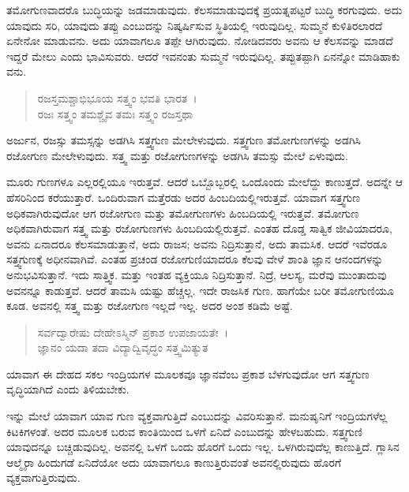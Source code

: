 ತಮೋಗುಣವಾದರೊ ಬುದ್ಧಿಯನ್ನು ಜಡಮಾಡುವುದು. ಕೆಲಸಮಾಡುವುದಕ್ಕೆ ಪ್ರಯತ್ನಪಟ್ಟರೆ ಬುದ್ಧಿ ಕರಗುವುದು. ಅದು ಯಾವುದು ಸರಿ, ಯಾವುದು ತಪ್ಪು ಎಂಬುದನ್ನು ನಿಷ್ಕರ್ಷಿಸುವ ಸ್ಥಿತಿಯಲ್ಲಿ ಇರುವುದಿಲ್ಲ. ಸುಮ್ಮನೆ ಕುಳಿತಿರಲಾರದೆ ಏನೇನೋ ಮಾಡುವನು. ಅದು ಯಾವಾಗಲೂ ತಪ್ಪೇ ಆಗಿರುವುದು. ನೋಡಿದವರು ಅವನು ಆ ಕೆಲಸವನ್ನು ಮಾಡದೆ ಇದ್ದರೆ ಮೇಲು ಎಂದು ಭಾವಿಸುವರು. ಆದರೆ ಇವನಂತು ಸುಮ್ಮನೆ ಇರುವುದಿಲ್ಲ. ತಪ್ಪುತಪ್ಪಾಗಿ ಏನನ್ನೋ ಮಾಡಿಹಾಕು ವನು.

\begin{verse}
ರಜಸ್ತಮಶ್ಚಾಭಿಭೂಯ ಸತ್ತ್ವಂ ಭವತಿ ಭಾರತ~।\\ರಜಃ ಸತ್ತ್ವಂ ತಮಶ್ಚೈವ ತಮಃ ಸತ್ತ್ವಂ ರಜಸ್ತಥಾ 
\end{verse}

{\small ಅರ್ಜುನ, ರಜಸ್ಸು ತಮಸ್ಸನ್ನು ಅಡಗಿಸಿ ಸತ್ತ್ವಗುಣ ಮೇಲೇಳುವುದು. ಸತ್ತ್ವಗುಣ ತಮೋಗುಣಗಳನ್ನು ಅಡಗಿಸಿ ರಜೋಗುಣ ಮೇಲೇಳುವುದು. ಸತ್ತ್ವ ಮತ್ತು ರಜೋಗುಣಗಳನ್ನು ಅಡಗಿಸಿ ತಮಸ್ಸು ಮೇಲೆ ಏಳುವುದು.}

ಮೂರು ಗುಣಗಳೂ ಎಲ್ಲರಲ್ಲಿಯೂ ಇರುತ್ತವೆ. ಆದರೆ ಒಬ್ಬೊಬ್ಬರಲ್ಲಿ ಒಂದೊಂದು ಮೇಲೆದ್ದು ಕಾಣುತ್ತದೆ. ಅದನ್ನೇ ಆ ಹೆಸರಿನಿಂದ ಕರೆಯುತ್ತಾರೆ. ಒಂದಿರುವಾಗ ಮತ್ತೆರಡು ಅದರ ಹಿಂಬದಿಯಲ್ಲಿಇರುತ್ತವೆ. ಯಾವಾಗ ಸತ್ತ್ವಗುಣ ಅಧಿಕವಾಗಿರುವುದೋ ಆಗ ರಜೋಗುಣ ಮತ್ತು ತಮೋಗುಣಗಳು ಹಿಂಬದಿಯಲ್ಲಿ ಇರುತ್ತವೆ. ತಮೋಗುಣ ಅಧಿಕವಾಗಿರುವಾಗ ಸತ್ತ್ವ ಮತ್ತು ರಜೋಗುಣಗಳು ಹಿಂಬದಿಯಲ್ಲಿರುತ್ತವೆ. ಎಂತಹ ದೊಡ್ಡ ಸಾತ್ವಿಕ ಜೀವಿಯಾದರೂ, ಅವನು ಏನಾದರೂ ಕೆಲಸಮಾಡುತ್ತಾನೆ, ಅದು ರಾಜಸ; ಅವನು ನಿದ್ರಿಸುತ್ತಾನೆ, ಅದು ತಾಮಸಿಕ. ಆದರೆ ಇವೆರಡೂ ಸತ್ತ್ವಗುಣಕ್ಕೆ ಅಧೀನವಾಗಿವೆ. ಎಂತಹ ಪ್ರಚಂಡ ರಜೋಗುಣಿಯಾದರೂ ಕೆಲವು ವೇಳೆ ಶಾಂತಿ ಜ್ಞಾನ ಆನಂದಗಳನ್ನು ಅನುಭವಿಸುತ್ತಾನೆ. ಇದು ಸಾತ್ತ್ವಿಕ. ಮತ್ತು ಇಂತಹ ವ್ಯಕ್ತಿಯೂ ನಿದ್ರಿಸುತ್ತಾನೆ. ನಿದ್ರೆ, ಆಲಸ್ಯ, ಮರೆವು ಮುಂತಾದುವು ಅವನನ್ನೂ ಕಾಡುತ್ತವೆ. ಆದರೆ ತಾಮಸಿ ಯಷ್ಟು ಹೆಚ್ಚಲ್ಲ. ಇದೇ ರಾಜಸಿಕ ಗುಣ. ಹಾಗೆಯೇ ಬರೀ ತಮೋಗುಣಿಯೂ ಕೂಡ. ಅವನಲ್ಲಿ ಸತ್ತ್ವ ಮತ್ತು ರಜೋಗುಣ ಇಲ್ಲದೆ ಇಲ್ಲ. ಅದರ ಅಂಶ ಕಡಿಮೆ ಅಷ್ಟೆ.

\begin{verse}
ಸರ್ವದ್ವಾರೇಷು ದೇಹೇಽಸ್ಮಿನ್ ಪ್ರಕಾಶ ಉಪಜಾಯತೇ~।\\ಜ್ಞಾನಂ ಯದಾ ತದಾ ವಿದ್ಯಾದ್ವಿವೃದ್ಧಂ ಸತ್ತ್ವಮಿತ್ಯುತ 
\end{verse}

{\small ಯಾವಾಗ ಈ ದೇಹದ ಸಕಲ ಇಂದ್ರಿಯಗಳ ಮೂಲಕವೂ ಜ್ಞಾನವೆಂಬ ಪ್ರಕಾಶ ಬೆಳಗುವುದೋ ಆಗ ಸತ್ತ್ವಗುಣ ವೃದ್ಧಿಯಾಗಿದೆ ಎಂದು ತಿಳಿಯಬೇಕು.}

ಇನ್ನು ಮೇಲೆ ಯಾವಾಗ ಯಾವ ಗುಣ ವ್ಯಕ್ತವಾಗುತ್ತಿದೆ ಎಂಬುದನ್ನು ವಿವರಿಸುತ್ತಾನೆ. ಮನುಷೃನಿಗೆ ಇಂದ್ರಿಯಗಳೆಲ್ಲ ಕಿಟಕಿಗಳಂತೆ. ಅದರ ಮೂಲಕ ಬರುವ ಕಾಂತಿಯಿಂದ ಒಳಗೆ ಏನಿದೆ ಎಂಬುದನ್ನು ಹೇಳಬಹುದು. ಸತ್ತ್ವಗುಣಿ ಯಾವುದನ್ನೂ ಬಚ್ಚಿಡುವುದಿಲ್ಲ. ಅವನಲ್ಲಿ ಒಳಗೆ ಒಂದು ಹೊರಗೆ ಒಂದು ಇಲ್ಲ. ಒಳಗಿರುವುದೆಲ್ಲ ಕಾಣುತ್ತಿದೆ. ಗ್ಲಾಸಿನ ಆಲ್ಮೈರಾ ಹಿಂದುಗಡೆ ಏನಿದೆಯೋ ಅದು ಯಾವಾಗಲೂ ಕಾಣುತ್ತಿರುವಂತೆ ಅವನಲ್ಲಿರುವುದು ಹೊರಗೆ ವ್ಯಕ್ತವಾಗುತ್ತಿರುವುದು.

